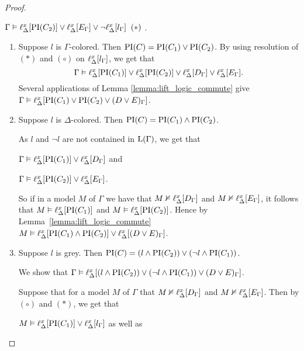 \begin{proof}
\begin{indproof}
			$\Gamma \entails \lift{\Delta}{ \PI(C_2) }{x} \lor
			\lift{\Delta}{ E_\Gamma }{x} \lor
			\lnot \lift{\Delta}{ l_\Gamma }{x} \;\; {(*)}$ .


			\begin{enumerate}
				\item Suppose $l$ is $\Gamma$-colored.
					Then $\PI(C) = \PI(C_1) \lor \PI(C_2)$.
					By using resolution of ${(*)}$ and ${(\circ)}$ on $\lift{\Delta}{l_\Gamma}{x}$, we get that 
					$$\Gamma \entails\lift{\Delta}{ \PI(C_1) }{x} \lor \lift{\Delta}{ \PI(C_2) }{x} \lor
					\lift{\Delta}{ D_\Gamma }{x} \lor
					\lift{\Delta}{ E_\Gamma }{x}.$$
					Several applications of Lemma \ref{lemma:lift_logic_commute} give
					$\Gamma \entails\lift{\Delta}{ \PI(C_1)  \lor  \PI(C_2) \lor (D \lor E)_\Gamma }{x}$.

				\item Suppose $l$ is $\Delta$-colored.
					Then $\PI(C) = \PI(C_1) \land \PI(C_2)$.

					As $l$ and $\lnot l$ are not contained in $\Lang(\Gamma)$, we get that 

					$\Gamma \entails \lift{\Delta}{ \PI(C_1) }{x} \lor
					\lift{\Delta}{ D_\Gamma }{x}$
					and

					$\Gamma \entails \lift{\Delta}{ \PI(C_2) }{x} \lor
					\lift{\Delta}{ E_\Gamma }{x}$.

					So if in a model $M$ of $\Gamma$ we have that
					$M \notentails \lift{\Delta}{ D_\Gamma }{x}$ and 
					$M \notentails \lift{\Delta}{ E_\Gamma }{x}$, it follows that $M \entails \lift{\Delta}{ \PI(C_1) }{x}$ and $M \entails \lift{\Delta}{ \PI(C_2) }{x}$. Hence by Lemma~\ref{lemma:lift_logic_commute}
					$M \entails \lift{\Delta}{ \PI(C_1) \land \PI(C_2) }{x} \lor
					\lift{\Delta}{ (D \lor E)_\Gamma }{x}$.

				\item Suppose $l$ is grey.
					Then $\PI(C) =  (l \land \PI(C_2)) \lor (\lnot l \land \PI(C_1))$.

					We show that 
					$\Gamma \entails \lift{\Delta}{(l \land \PI(C_2)) \lor (\lnot l \land \PI(C_1)) \lor (D \lor E)_\Gamma  }{x} $. 

					Suppose that for a model $M$ of $\Gamma$ that 
					$M \notentails \lift{\Delta}{ D_\Gamma }{x}$ and 
					$M \notentails \lift{\Delta}{ E_\Gamma }{x}$.
					Then by ${(\circ)}$
					and ${(*)}$, we get that\nopagebreak

					$M \entails \lift{\Delta}{ \PI(C_1) }{x} \lor
					\lift{\Delta}{ l_\Gamma }{x}$ as well as


\end{enumerate}
\end{indproof}
\end{proof}
